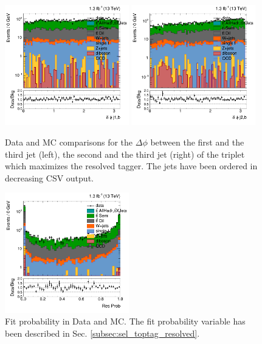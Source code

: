 \begin{figure}[htbp]
	\centering
	\includegraphics[width=0.48\textwidth]{figures/semilep_1tightmuo_resolved_3ormorejets_2ormorejetWPm_pfmetmore100_pfmtmore40_trigrequestonMC_qgsmearedwith8TeVrecipe_Oct302015/hResBDTDPhij1b.png}
	\includegraphics[width=0.48\textwidth]{figures/semilep_1tightmuo_resolved_3ormorejets_2ormorejetWPm_pfmetmore100_pfmtmore40_trigrequestonMC_qgsmearedwith8TeVrecipe_Oct302015/hResBDTDPhij2b.png}
	\caption{Data and MC comparisons for the $\Delta \phi$  between the first and the third jet (left), the second and the third jet (right) of the triplet which maximizes the resolved tagger. The jets have been ordered in decreasing CSV output.}
	\label{fig:dphij12b13TeV}
\end{figure}

\begin{figure}[htbp]
	\centering
	\includegraphics[width=0.48\textwidth]{figures/semilep_1tightmuo_resolved_3ormorejets_2ormorejetWPm_pfmetmore100_pfmtmore40_trigrequestonMC_qgsmearedwith8TeVrecipe_Oct302015/hResProb.png}
	\caption{Fit probability in Data and MC. The fit probability variable has been described in Sec. \ref{subsec:sel_toptag_resolved}.}
	\label{fig:fitprob13TeV}
\end{figure}